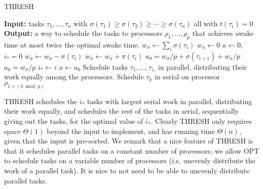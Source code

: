 \begin{algorithm}
  \caption{THRESH}
  \label{alg:thresh}
  \begin{algorithmic}
    \State \textbf{Input:} tasks $\tau_1,\ldots, \tau_n$ with
    $\sigma(\tau_1) \ge \sigma(\tau_2)\ge \cdots \ge
    \sigma(\tau_n)$ all with $t(\tau_i) = 0$
    \State \textbf{Output:} a way to schedule the tasks to
    processors $\rho_1, \ldots, \rho_p$ that achieves awake time
    at most twice the optimal awake time.
    \State
    \State $w_\sigma \gets \sum_i \sigma(\tau_i)$
    \State $w_\pi \gets 0$
    \State $a \gets 0$, $i_* = 0$
      \State $w_\sigma \gets w_\sigma - \sigma(\tau_i)$
      \State $w_\pi \gets w_\pi + \pi(\tau_i)$
        \State $a_0 = w_\sigma / p + \sigma(\tau_{i+1}) + w_\pi/p$
      \Else
        \State $a_0 = w_\pi/p$
      \EndIf
        \State $i_* \gets i$
        \State $a \gets a_0$
      \EndIf
    \EndFor
    \State Schedule tasks $\tau_1, \ldots, \tau_{i_*}$ in
    parallel, distributing their work equally among the
    processors.
    \State Schedule $\tau_{k}$ in serial on processor $\rho_{1+(k \bmod p)}$
    \EndFor
  \end{algorithmic}
\end{algorithm}

THRESH schedules the $i_*$ tasks with largest serial work in
parallel, distributing their work equally, and schedules the rest
of the tasks in serial, sequentially giving out the tasks, for
the optimal value of $i_*$. Clearly THRESH only requires space
$\Theta(1)$ beyond the input to implement, and has running time
$\Theta(n)$, given that the input is pre-sorted.
We remark that a nice feature of THRESH is that it schedules
parallel tasks on a constant number of processors; we allow OPT
to schedule tasks on a variable number of processors (i.e.
unevenly distribute the work of a parallel task). It is nice to
not need to be able to unevenly distribute parallel tasks.

